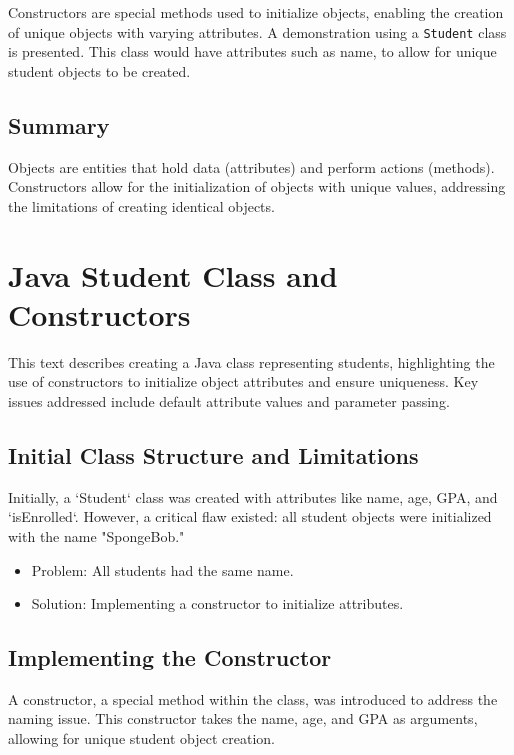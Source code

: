 \documentclass{article}
\begin{document}
Constructors are special methods used to initialize objects, enabling the creation of unique objects with varying attributes.  A demonstration using a \texttt{Student} class is presented.  This class would have attributes such as name, to allow for unique student objects to be created.


\subsection{Summary}

Objects are entities that hold data (attributes) and perform actions (methods). Constructors allow for the initialization of objects with unique values, addressing the limitations of creating identical objects.


\section{Java Student Class and Constructors}

This text describes creating a Java class representing students, highlighting the use of constructors to initialize object attributes and ensure uniqueness.  Key issues addressed include default attribute values and parameter passing.

\subsection{Initial Class Structure and Limitations}

Initially, a `Student` class was created with attributes like name, age, GPA, and `isEnrolled`.  However, a critical flaw existed: all student objects were initialized with the name "SpongeBob."

\begin{itemize}
    \item Problem: All students had the same name.
    \item Solution: Implementing a constructor to initialize attributes.
\end{itemize}

\subsection{Implementing the Constructor}

A constructor, a special method within the class, was introduced to address the naming issue.  This constructor takes the name, age, and GPA as arguments, allowing for unique student object creation.
\end{document}
